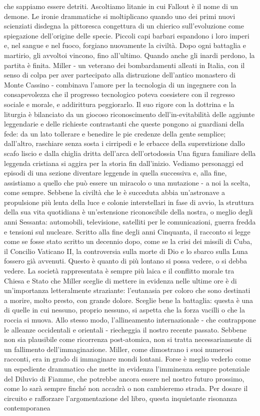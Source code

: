 che sappiamo essere detriti. Ascoltiamo litanie in cui Fallout è il nome di un demone. Le ironie drammatiche si moltiplicano quando uno dei primi nuovi scienziati disdegna la pittoresca congettura di un chierico sull'evoluzione come spiegazione dell'origine delle specie. Piccoli capi barbari espandono i loro imperi e, nel sangue e nel fuoco, forgiano nuovamente la civiltà. Dopo ogni battaglia e martirio, gli avvoltoi vincono, fino all'ultimo. Quando anche gli inardi perdono, la partita è finita. Miller - un veterano dei bombardamenti alleati in Italia, con il senso di colpa per aver partecipato alla distruzione dell'antico monastero di Monte Cassino - combinava l'amore per la tecnologia di un ingegnere con la consapevolezza che il progresso tecnologico poteva coesistere con il regresso sociale e morale, e addirittura peggiorarlo. Il suo rigore con la dottrina e la liturgia è bilanciato da un giocoso riconoscimento dell'in-evitabilità delle aggiunte leggendarie e delle richieste contrastanti che queste pongono ai guardiani della fede: da un lato tollerare e benedire le pie credenze della gente semplice; dall'altro, raschiare senza sosta i cirripedi e le erbacce della superstizione dallo scafo liscio e dalla chiglia dritta dell'arca dell'ortodossia Una figura familiare della leggenda cristiana si aggira per la storia fin dall'inizio. Vediamo personaggi ed episodi di una sezione diventare leggende in quella successiva e, alla fine, assistiamo a quello che può essere un miracolo o una mutazione - a noi la scelta, come sempre. Sebbene la civiltà che le è succeduta abbia un'astronave a propulsione più lenta della luce e colonie interstellari in fase di avvio, la struttura della sua vita quotidiana è un'estensione riconoscibile della nostra, o meglio degli anni Sessanta: automobili, televisione, satelliti per le comunicazioni, guerra fredda e tensioni sul nucleare. Scritto alla fine degli anni Cinquanta, il racconto si legge come se fosse stato scritto un decennio dopo, come se la crisi dei missili di Cuba, il Concilio Vaticano II, la controversia sulla morte di Dio e lo sbarco sulla Luna fossero già avvenuti. Questo è quanto di più lontano si possa vedere, o si debba vedere. La società rappresentata è sempre più laica e il conflitto morale tra Chiesa e Stato che Miller sceglie di mettere in evidenza nelle ultime ore è di un'importanza letteralmente straziante: l'eutanasia per coloro che sono destinati a morire, molto presto, con grande dolore. Sceglie bene la battaglia: questa è una di quelle in cui nessuno, proprio nessuno, si aspetta che la forza vacilli o che la roccia si muova. Allo stesso modo, l'allineamento internazionale - che contrappone le alleanze occidentali e orientali - riecheggia il nostro recente passato. Sebbene non sia plausibile come ricorrenza post-atomica, non si tratta necessariamente di un fallimento dell'immaginazione. Miller, come dimostrano i suoi numerosi racconti, era in grado di immaginare mondi lontani. Forse è meglio vederlo come un espediente drammatico che mette in evidenza l'imminenza sempre potenziale del Diluvio di Fiamme, che potrebbe ancora essere nel nostro futuro prossimo, come lo sarà sempre finché non accadrà o non cambieremo strada. Per dosare il circuito e rafforzare l'argomentazione del libro, questa inquietante risonanza contemporanea 